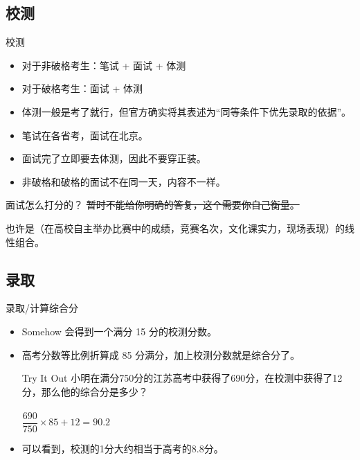 \documentclass{beamer}
\begin{document}
\subsection{校测}
\begin{frame}{校测}
    \begin{itemize}
        \pause
        \item 对于非破格考生：笔试 + 面试 + 体测
        \item 对于破格考生：面试 + 体测
        \item 体测一般是考了就行，但官方确实将其表述为“同等条件下优先录取的依据”。
        \pause
        \item 笔试在各省考，面试在北京。
        \item 面试完了立即要去体测，因此不要穿正装。
        \item 非破格和破格的面试不在同一天，内容不一样。
        \pause
    \end{itemize}
    \begin{exampleblock}{面试怎么打分的？}
    \sout{暂时不能给你明确的答复，这个需要你自己衡量。} \par
    也许是（在高校自主举办比赛中的成绩，竞赛名次，文化课实力，现场表现）的线性组合。
    \end{exampleblock}
\end{frame}

\subsection{录取}
\begin{frame}{录取/计算综合分}
    \begin{itemize}
        \pause
        \item Somehow 会得到一个满分 15 分的校测分数。
        \item 高考分数等比例折算成 85 分满分，加上校测分数就是综合分了。
        \pause
        \begin{block}{Try It Out}
        小明在满分750分的江苏高考中获得了690分，在校测中获得了12分，那么他的综合分是多少？\\~\\
        \pause
        $\dfrac{690}{750}\times 85 + 12 = 90.2$
        \end{block}
        \pause
        \item 可以看到，校测的1分大约相当于高考的8.8分。
    \end{itemize}
\end{frame}
\end{document}
